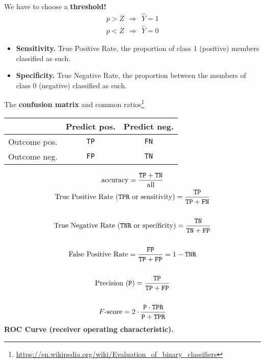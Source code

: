 We have to choose a \textbf{threshold!}
\begin{gather*}
    p >\overline{Z} \ \ \Longrightarrow \ \ \hat{Y} =1\\
    p< \overline{Z} \ \ \Longrightarrow \ \ \hat{Y} =0
\end{gather*}

\begin{itemize}
    \item \textbf{Sensitivity.} True Positive Rate, the proportion of class 1 (positive) members classified as such.
    \item \textbf{Specificity.} True Negative Rate, the proportion between the members of class 0 (negative) classified as such.
\end{itemize}

The \textbf{confusion matrix} and common ratios\footnote{\url{https://en.wikipedia.org/wiki/Evaluation_of_binary_classifiers}}

\begin{center}
    \begin{tabular}{|c|c|c|}
        \hline 
                     & Predict pos. & Predict neg. \\
        \hline 
        Outcome pos. & \texttt{TP}         & \texttt{FN}         \\
        \hline 
        Outcome neg. & \texttt{FP}         & \texttt{TN}         \\
        \hline
    \end{tabular}
\end{center}

\begin{gather*}
    \text{accuracy} =\frac{\texttt{TP}+\texttt{TN}}{\text{all}}\\
    \text{True Positive Rate (\texttt{TPR} or sensitivity)} =\frac{\texttt{TP}}{\texttt{TP}+\texttt{FN}}\\
    \\
    \text{True Negative Rate (\texttt{TNR} or specificity)} =\frac{\texttt{TN}}{\texttt{TN}+\texttt{FP}}\\
    \\
    \text{False Positive Rate} =\frac{\texttt{FP}}{\texttt{TP}+\texttt{FP}} = 1 - \texttt{TNR}\\
    \\
    \text{Precision (\texttt{P})} = \frac{\texttt{TP}}{\texttt{TP}+\texttt{FP}}\\
    \\
    F\text{-score} = 2 \cdot \frac{\texttt{P} \cdot \texttt{TPR}}{\texttt{P} + \texttt{TPR}}
\end{gather*}
\textbf{ROC Curve (receiver operating characteristic).}

